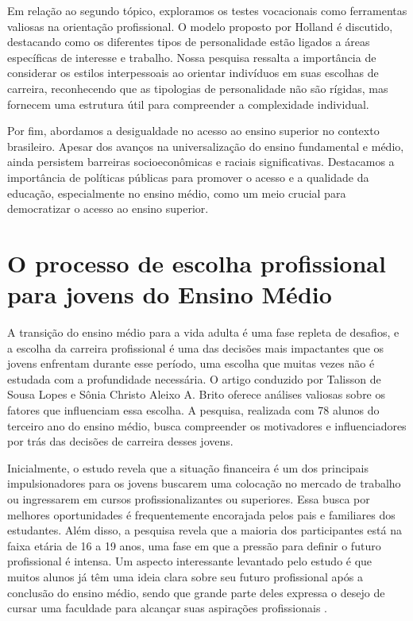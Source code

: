 Em relação ao segundo tópico, exploramos os testes vocacionais como ferramentas valiosas na orientação profissional. O modelo proposto por Holland é discutido, destacando como os diferentes tipos de personalidade estão ligados a áreas específicas de interesse e trabalho. Nossa pesquisa ressalta a importância de considerar os estilos interpessoais ao orientar indivíduos em suas escolhas de carreira, reconhecendo que as tipologias de personalidade não são rígidas, mas fornecem uma estrutura útil para compreender a complexidade individual.

Por fim, abordamos a desigualdade no acesso ao ensino superior no contexto brasileiro. Apesar dos avanços na universalização do ensino fundamental e médio, ainda persistem barreiras socioeconômicas e raciais significativas. Destacamos a importância de políticas públicas para promover o acesso e a qualidade da educação, especialmente no ensino médio, como um meio crucial para democratizar o acesso ao ensino superior.



\section{O processo de escolha profissional para jovens do Ensino Médio}

A transição do ensino médio para a vida adulta é uma fase repleta de desafios, e a escolha da carreira profissional é uma das decisões mais impactantes que os jovens enfrentam durante esse período, uma escolha que muitas vezes não é estudada com a profundidade necessária. O artigo conduzido por Talisson de Sousa Lopes e Sônia Christo Aleixo A. Brito   oferece análises valiosas sobre os fatores que influenciam essa escolha. A pesquisa, realizada com 78 alunos do terceiro ano do ensino médio, busca compreender os motivadores e influenciadores por trás das decisões de carreira desses jovens.

Inicialmente, o estudo revela que a situação financeira é um dos principais impulsionadores para os jovens buscarem uma colocação no mercado de trabalho ou ingressarem em cursos profissionalizantes ou superiores. Essa busca por melhores oportunidades é frequentemente encorajada pelos pais e familiares dos estudantes.
Além disso, a pesquisa revela que a maioria dos participantes está na faixa etária de 16 a 19 anos, uma fase em que a pressão para definir o futuro profissional é intensa. Um aspecto interessante levantado pelo estudo é que muitos alunos já têm uma ideia clara sobre seu futuro profissional após a conclusão do ensino médio, sendo que grande parte deles expressa o desejo de cursar uma faculdade para alcançar suas aspirações profissionais \cite{lopes2022fim}.

